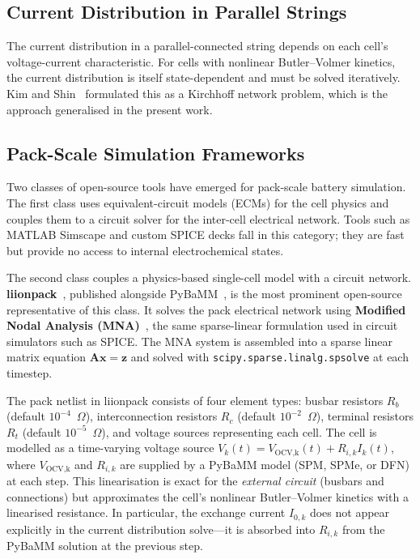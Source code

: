 \subsection{Current Distribution in Parallel Strings}
\label{ssec:lit_current_dist}

The current distribution in a parallel-connected string depends on each cell's voltage-current characteristic. For cells with nonlinear Butler--Volmer kinetics, the current distribution is itself state-dependent and must be solved iteratively. Kim and Shin~\cite{Kim2011} formulated this as a Kirchhoff network problem, which is the approach generalised in the present work.

\subsection{Pack-Scale Simulation Frameworks}
\label{ssec:lit_pack_frameworks}

Two classes of open-source tools have emerged for pack-scale battery simulation. The first class uses equivalent-circuit models (ECMs) for the cell physics and couples them to a circuit solver for the inter-cell electrical network. Tools such as MATLAB Simscape and custom SPICE decks fall in this category; they are fast but provide no access to internal electrochemical states.

The second class couples a physics-based single-cell model with a circuit network. \textbf{liionpack}~\cite{Tranter2022}, published alongside PyBaMM~\cite{Sulzer2021}, is the most prominent open-source representative of this class. It solves the pack electrical network using \textbf{Modified Nodal Analysis (MNA)}~\cite{Ho1975}, the same sparse-linear formulation used in circuit simulators such as SPICE. The MNA system is assembled into a sparse linear matrix equation $\mathbf{A}\mathbf{x} = \mathbf{z}$ and solved with \texttt{scipy.sparse.linalg.spsolve} at each timestep.

The pack netlist in liionpack consists of four element types: busbar resistors $R_b$ (default $10^{-4}$~$\Omega$), interconnection resistors $R_c$ (default $10^{-2}$~$\Omega$), terminal resistors $R_t$ (default $10^{-5}$~$\Omega$), and voltage sources representing each cell. The cell is modelled as a time-varying voltage source $V_k(t) = V_\text{OCV,k}(t) + R_{i,k} I_k(t)$, where $V_\text{OCV,k}$ and $R_{i,k}$ are supplied by a PyBaMM model (SPM, SPMe, or DFN) at each step. This linearisation is exact for the \emph{external circuit} (busbars and connections) but approximates the cell's nonlinear Butler--Volmer kinetics with a linearised resistance. In particular, the exchange current $I_{0,k}$ does not appear explicitly in the current distribution solve---it is absorbed into $R_{i,k}$ from the PyBaMM solution at the previous step.

